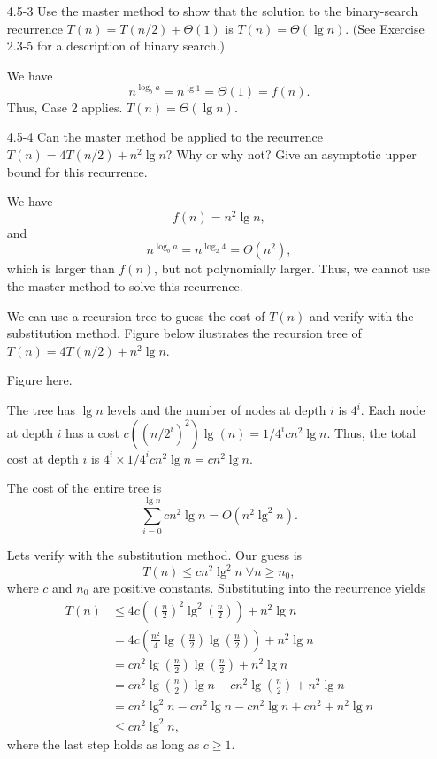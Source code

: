 \documentclass{report}
\makeatletter
\renewenvironment{framed}{%
 \def\FrameCommand##1{\hskip\@totalleftmargin
 \fboxsep=\FrameSep\fbox{##1}}%
 \MakeFramed {\advance\hsize-\width
   \@totalleftmargin\z@ \linewidth\hsize
   \@setminipage}}%
 {\par\unskip\endMakeFramed}
\DeclareMathOperator{\Forall}{\forall}
\makeatother
\begin{document}
\begin{enumerate}
\item[4.5{-}3]{Use the master method to show that the solution to the
binary-search recurrence $T(n) = T(n/2) + \Theta(1)$ is $T(n) = \Theta(\lg n)$.
(See Exercise 2.3-5 for a description of binary search.)}

\begin{framed}
We have
\[
n^{\log_b a} = n^{\lg 1} = \Theta(1) = f(n).
\]
Thus, Case 2 applies. $T(n) = \Theta(\lg n)$.
\end{framed}

\newpage

\item[4.5{-}4]{Can the master method be applied to the recurrence
$T(n) = 4 T(n/2) + n^2 \lg n$? Why or why not? Give an asymptotic upper bound
for this recurrence.}

\begin{framed}
We have
\[
  f(n) = n^2 \lg n,
\]
and
\[
n^{\log_b a} = n^{\log_2 4} = \Theta(n^2),
\]
which is larger than $f(n)$, but not polynomially larger. Thus, we cannot use the
master method to solve this recurrence.

We can use a recursion tree to guess the cost of $T(n)$ and verify with the
substitution method. Figure below ilustrates the recursion tree of
$T(n) = 4 T(n/2) + n^2 \lg n$.

\begin{center} Figure here. \end{center}

The tree has $\lg n$ levels and the number of nodes at depth $i$ is $4^i$. Each
node at depth $i$ has a cost $c((n/2^i)^2) \lg(n) = 1/4^i c n^2 \lg n$. Thus,
the total cost at depth $i$ is $4^i \times 1/4^i c n^2 \lg n = c n^2 \lg n$.

The cost of the entire tree is
\[
  \sum_{i = 0}^{\lg n} c n^2 \lg n = O(n^2 \lg^2 n).
\]

Lets verify with the substitution method. Our guess is
\[
T(n) \le cn^2\lg^2 n \; \Forall n \ge n_0,
\]
where $c$ and $n_0$ are positive constants. Substituting into the
recurrence yields
\begin{equation*}
\begin{aligned}
  T(n) &\le 4c \left(\left(\frac{n}{2}\right)^2 \lg^2{\left(\frac{n}{2}\right)}\right) + n^2 \lg n\\
       &=   4c \left(\frac{n^2}{4} \lg{\left(\frac{n}{2}\right)}\lg{\left(\frac{n}{2}\right)}\right) + n^2 \lg n\\
       &=   c n^2 \lg{\left(\frac{n}{2}\right)}\lg{\left(\frac{n}{2}\right)} + n^2 \lg n\\
       &=   c n^2 \lg{\left(\frac{n}{2}\right)}\lg n - c n^2 \lg{\left(\frac{n}{2}\right)} + n^2 \lg n\\
       &=   c n^2 \lg^2 n - c n^2 \lg n - c n^2 \lg n + c n^2 + n^2 \lg n\\
       &\le c n^2 \lg^2 n,
\end{aligned}
\end{equation*}
where the last step holds as long as $c \ge 1$.


\end{framed}
\end{enumerate}
\end{document}
